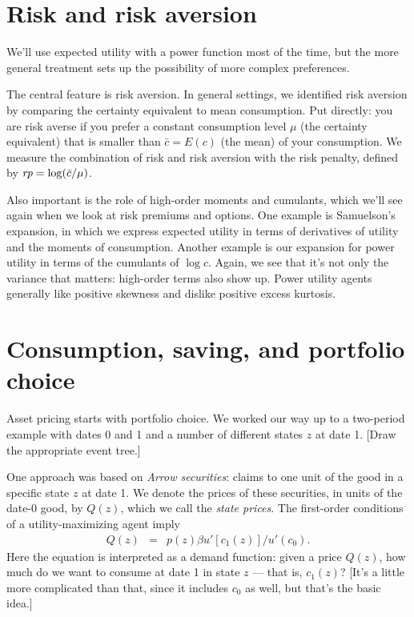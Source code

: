 \documentclass[11pt]{article}
\begin{document}
\section*{Risk and risk aversion}

We'll use expected utility with a power function most of the time,
but the more general treatment sets up
the possibility of more complex preferences.

The central feature is risk aversion.
In general settings, we identified risk aversion by
comparing the certainty equivalent to mean consumption.
Put directly:  you are risk averse if you prefer a constant consumption
level $\mu$ (the certainty equivalent) that is smaller than $\bar{c} = E(c)$ (the mean)
of your consumption.
We measure the combination of risk and risk aversion with the risk penalty,
defined by $ \mbox{\it rp} = \log (\bar{c}/\mu)$.

Also important is the role of high-order moments and cumulants,
which we'll see again when we look at risk premiums and options.
One example is Samuelson's expansion, in which we express
expected utility in terms of derivatives of utility and the moments of consumption.
Another example is our expansion for power utility in terms
of the cumulants of $\log c$.
Again, we see that it's not only the variance that matters:
high-order terms also show up.
Power utility agents generally like positive skewness and dislike
positive excess kurtosis.


\section*{Consumption, saving, and portfolio choice}

Asset pricing starts with portfolio choice.
We worked our way up to a two-period example
with dates 0 and 1 and a number of different states $z$ at date 1.
[Draw the appropriate event tree.]

One approach was based on {\it Arrow securities\/}:
claims to one unit of the good in a specific state $z$ at date 1.
We denote the prices of these securities, in units of the date-0 good, by
$Q(z)$, which we call the {\it state prices\/}.
The first-order conditions of a utility-maximizing agent  imply
\begin{eqnarray}
    Q(z) &=& p(z) \beta u'[c_1(z)]/u'(c_0) .
    \label{eq:state-prices=mrs}
\end{eqnarray}
Here the equation is interpreted as a demand function: given a price $Q(z)$,
how much do we want to consume at date 1 in state $z$ --- that is, $c_1(z)$?
[It's a little more complicated than that, since it includes $c_0$ as well,
but that's the basic idea.]
\end{document}
